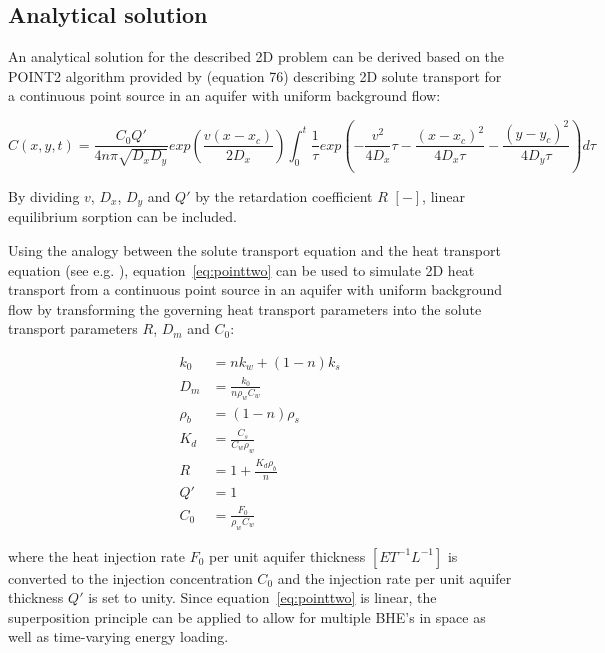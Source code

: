

\subsection{Analytical solution}

An analytical solution for the described 2D problem can be derived based on the POINT2 algorithm provided by \cite{wexler1992} (equation 76) describing 2D solute transport for a continuous point source in an aquifer with uniform background flow:

\begin{equation}
    C(x,y,t) = \frac{C_0Q'}{4n\pi\sqrt{D_xD_y}}exp(\frac{v(x-x_c)}{2D_x})\int_0^t\frac{1}{\tau} exp(-\frac{v^2}{4D_x}\tau - \frac{(x-x_c)^2}{4D_x\tau}-\frac{(y-y_c)^2}{4D_y\tau})d\tau
    \label{eq:pointtwo}
\end{equation}

By dividing $v$, $D_x$, $D_y$ and $Q'$ by the retardation coefficient $R$ $[-]$, linear equilibrium sorption can be included.

Using the analogy between the solute transport equation and the heat transport equation (see e.g. \cite{zheng2010mt3dmsv5.3}), equation~\ref{eq:pointtwo} can be used to simulate 2D heat transport from a continuous point source in an aquifer with uniform background flow by transforming the governing heat transport parameters into the solute transport parameters $R$, $D_m$ and $C_0$:

\begin{align}
    k_0 &= n k_w + (1 - n) k_s \label{eq:bhe-k0}\\
    D_m &= \frac{k_0}{n  \rho_w  C_w}  \label{eq:bhe-Dm}\\
    \rho_b &= (1 - n) \rho_s  \label{eq:bhe-rhob}\\
    K_d &= \frac{C_s}{C_w \rho_w}  \label{eq:bhe-KD}\\
    R &= 1 + \frac{K_d \rho_b}{n}  \label{eq:bhe-R}\\
    Q' &= 1  \label{eq:bhe-Q}\\
    C_0 &= \frac{F_0}{\rho_w C_w}  \label{eq:bhe-c0}
\end{align}

where the heat injection rate $F_0$ per unit aquifer thickness $[ET^{-1}L^{-1}]$ is converted to the injection concentration $C_0$ and the injection rate per unit aquifer thickness $Q'$ is set to unity. Since equation~\ref{eq:pointtwo} is linear, the superposition principle can be applied to allow for multiple BHE's in space as well as time-varying energy loading.

